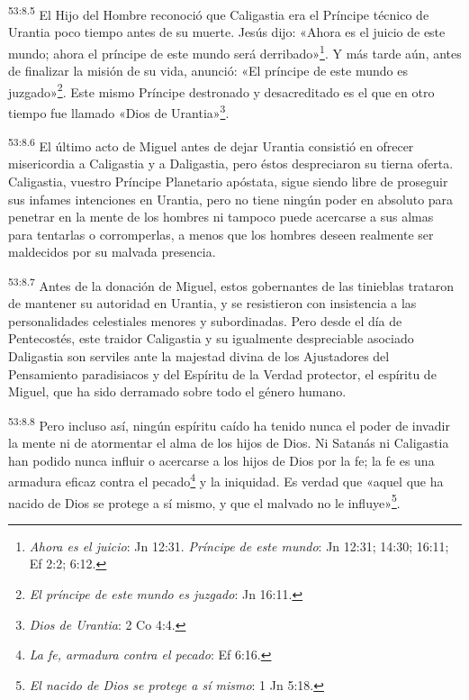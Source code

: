 \par
\textsuperscript{53:8.5} El Hijo del Hombre reconoció que Caligastia era el Príncipe técnico de Urantia poco tiempo antes de su muerte. Jesús dijo: «Ahora es el juicio de este mundo; ahora el príncipe de este mundo será derribado»\footnote{\textit{Ahora es el juicio}: Jn 12:31. \textit{Príncipe de este mundo}: Jn 12:31; 14:30; 16:11; Ef 2:2; 6:12.}. Y más tarde aún, antes de finalizar la misión de su vida, anunció: «El príncipe de este mundo es juzgado»\footnote{\textit{El príncipe de este mundo es juzgado}: Jn 16:11.}. Este mismo Príncipe destronado y desacreditado es el que en otro tiempo fue llamado «Dios de Urantia»\footnote{\textit{Dios de Urantia}: 2 Co 4:4.}.

\par
\textsuperscript{53:8.6} El último acto de Miguel antes de dejar Urantia consistió en ofrecer misericordia a Caligastia y a Daligastia, pero éstos despreciaron su tierna oferta. Caligastia, vuestro Príncipe Planetario apóstata, sigue siendo libre de proseguir sus infames intenciones en Urantia, pero no tiene ningún poder en absoluto para penetrar en la mente de los hombres ni tampoco puede acercarse a sus almas para tentarlas o corromperlas, a menos que los hombres deseen realmente ser maldecidos por su malvada presencia.

\par
\textsuperscript{53:8.7} Antes de la donación de Miguel, estos gobernantes de las tinieblas trataron de mantener su autoridad en Urantia, y se resistieron con insistencia a las personalidades celestiales menores y subordinadas. Pero desde el día de Pentecostés, este traidor Caligastia y su igualmente despreciable asociado Daligastia son serviles ante la majestad divina de los Ajustadores del Pensamiento paradisiacos y del Espíritu de la Verdad protector, el espíritu de Miguel, que ha sido derramado sobre todo el género humano.

\par
\textsuperscript{53:8.8} Pero incluso así, ningún espíritu caído ha tenido nunca el poder de invadir la mente ni de atormentar el alma de los hijos de Dios. Ni Satanás ni Caligastia han podido nunca influir o acercarse a los hijos de Dios por la fe; la fe es una armadura eficaz contra el pecado\footnote{\textit{La fe, armadura contra el pecado}: Ef 6:16.} y la iniquidad. Es verdad que «aquel que ha nacido de Dios se protege a sí mismo, y que el malvado no le influye»\footnote{\textit{El nacido de Dios se protege a sí mismo}: 1 Jn 5:18.}.

